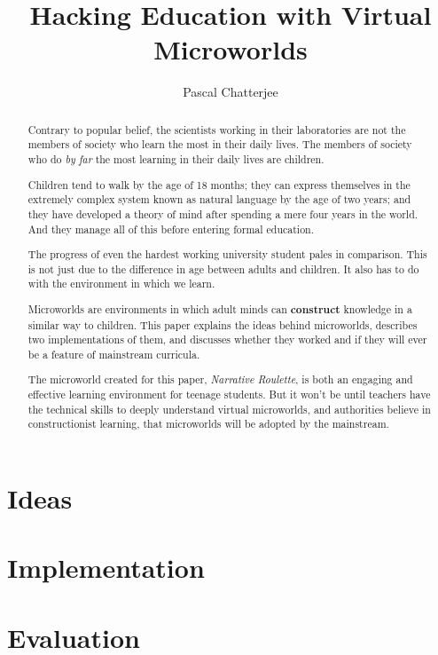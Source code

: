 \documentclass[a4paper]{report}
\title{Hacking Education with Virtual Microworlds}
\author{Pascal Chatterjee}
\begin{document}
\maketitle

\begin{abstract}
Contrary to popular belief, the scientists working in their laboratories are not the members of society who learn the most in their daily lives. The members of society who do \textit{by far} the most learning in their daily lives are children. 

Children tend to walk by the age of 18 months; they can express themselves in the extremely complex system known as natural language by the age of two years; and they have developed a theory of mind after spending a mere four years in the world. And they manage all of this before entering formal education.

The progress of even the hardest working university student pales in comparison. This is not just due to the difference in age between adults and children. It also has to do with the environment in which we learn.

Microworlds are environments in which adult minds can \textbf{construct} knowledge in a similar way to children. This paper explains the ideas behind microworlds, describes two implementations of them, and discusses whether they worked and if they will ever be a feature of mainstream curricula. 

The microworld created for this paper, \textit{Narrative Roulette}, is both an engaging and effective learning environment for teenage students. But it won't be until teachers have the technical skills to deeply understand virtual microworlds, and authorities believe in constructionist learning, that microworlds will be adopted by the mainstream.
\end{abstract}

\tableofcontents

\chapter{Ideas}







\chapter{Implementation}





\chapter{Evaluation}




\end{document}
